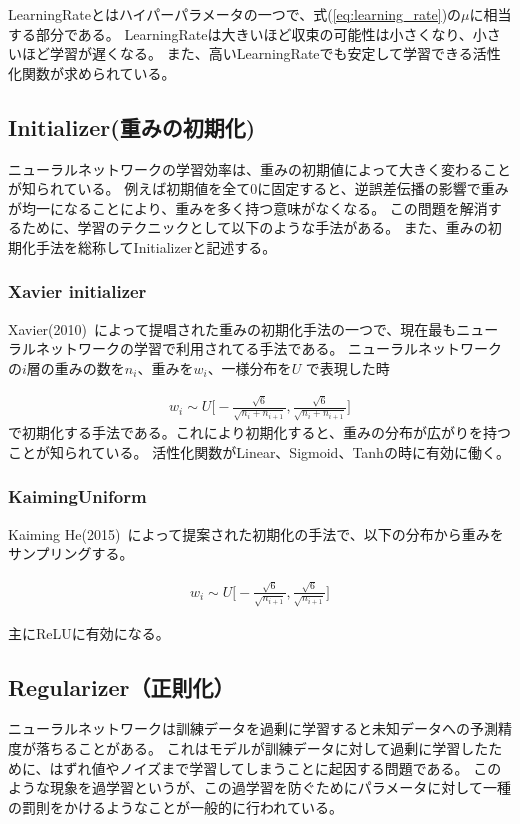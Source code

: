 LearningRateとはハイパーパラメータの一つで、式(\ref{eq:learning_rate})の$ \mu $に相当する部分である。
LearningRateは大きいほど収束の可能性は小さくなり、小さいほど学習が遅くなる。
また、高いLearningRateでも安定して学習できる活性化関数が求められている。


\subsection{Initializer(重みの初期化)}
ニューラルネットワークの学習効率は、重みの初期値によって大きく変わることが知られている。
例えば初期値を全て$ 0 $に固定すると、逆誤差伝播の影響で重みが均一になることにより、重みを多く持つ意味がなくなる。
この問題を解消するために、学習のテクニックとして以下のような手法がある。
また、重みの初期化手法を総称してInitializerと記述する。

\subsubsection{Xavier initializer}
Xavier(2010)~\cite{xavier}によって提唱された重みの初期化手法の一つで、現在最もニューラルネットワークの学習で利用されてる手法である。
ニューラルネットワークの$ i $層の重みの数を$ n_{i} $、重みを$ w_i $、一様分布を$U$ で表現した時

\begin{eqnarray}
w_{i} \sim U \bigl[ - \frac{\sqrt{6}}{ \sqrt{n_i + n_{i+1}} }, \frac{\sqrt{6}}{ \sqrt{n_i + n_{i+1} }} \bigr]
\end{eqnarray}
で初期化する手法である。これにより初期化すると、重みの分布が広がりを持つことが知られている。
活性化関数がLinear、Sigmoid、Tanhの時に有効に働く。

\subsubsection{KaimingUniform}
Kaiming He(2015)~\cite{kaiming}によって提案された初期化の手法で、以下の分布から重みをサンプリングする。

\begin{eqnarray}
w_{i} \sim U \bigl[ - \frac{\sqrt{6}}{ \sqrt{n_{i+1}} }, \frac{\sqrt{6}}{ \sqrt{ n_{i+1} }} \bigr]
\end{eqnarray}

主にReLUに有効になる。


\subsection{Regularizer（正則化）}
ニューラルネットワークは訓練データを過剰に学習すると未知データへの予測精度が落ちることがある。
これはモデルが訓練データに対して過剰に学習したために、はずれ値やノイズまで学習してしまうことに起因する問題である。
このような現象を過学習というが、この過学習を防ぐためにパラメータに対して一種の罰則をかけるようなことが一般的に行われている。

